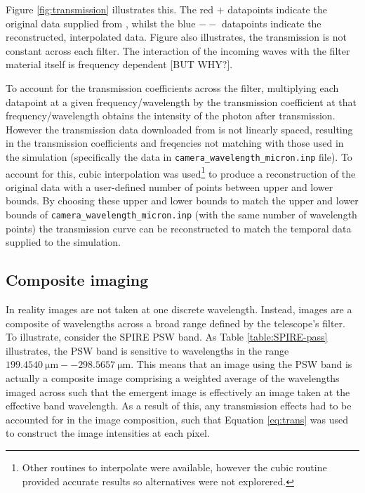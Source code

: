 \documentclass{report}
\begin{document}
Figure \ref{fig:transmission} illustrates this. The red $+$ datapoints indicate the original data supplied from \textcite{pass}, whilst the blue $--$ datapoints indicate the reconstructed, interpolated data. Figure \label{fig:transmissions} also illustrates, the transmission is not constant across each filter. The interaction of the incoming waves with the filter material itself is frequency dependent [BUT WHY?].

To account for the transmission coefficients across the filter, multiplying each datapoint at a given frequency/wavelength by the transmission coefficient at that frequency/wavelength obtains the intensity of the photon after transmission. However the transmission data downloaded from \textcite{pass} is not linearly spaced, resulting in the transmission coefficients and freqencies not matching with those used in the simulation (specifically the data in \texttt{camera\_wavelength\_micron.inp} file). To account for this, cubic interpolation was used\footnote{Other routines to interpolate were available, however the cubic routine provided accurate results so alternatives were not explorered.} to produce a reconstruction of the original data with a user-defined number of points between upper and lower bounds. By choosing these upper and lower bounds to match the upper and lower bounds of \texttt{camera\_wavelength\_micron.inp} (with the same number of wavelength points) the transmission curve can be reconstructed to match the temporal data supplied to the simulation.

\subsection{Composite imaging} \label{comp}
In reality images are not taken at one discrete wavelength. Instead, images are a composite of wavelengths across a broad range defined by the telescope's filter. To illustrate, consider the SPIRE PSW band. As Table \ref{table:SPIRE-pass} illustrates, the PSW band is sensitive to wavelengths in the range $\SI{199.4540}{\micro\meter} --	\SI{298.5657}{\micro\meter}$. This means that an image using the PSW band is actually a composite image comprising a weighted average of the wavelengths imaged across such that the emergent image is effectively an image taken at the effective band wavelength. As a result of this, any transmission effects had to be accounted for in the image composition, such that Equation \ref{eq:trans} was used to construct the image intensities at each pixel.
\end{document}
